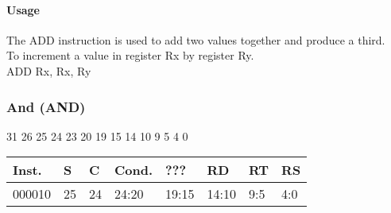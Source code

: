 \documentclass[12pt]{article}
\begin{document}
    \paragraph{Usage}
    \begin{flushleft}
    The ADD instruction is used to add two values together and produce a third.\\
    \vspace{1em}
    To increment a value in register Rx by register Ry.\\
    \vspace{1em}
    ADD Rx, Rx, Ry
    \end{flushleft}
    




    \newpage
    \subsubsection{And (AND)}
    
    \hspace{1.6cm}31 \hspace{1.2cm}26 \hspace{.075cm}25 \hspace{.15cm}24 \hspace{.075cm}23 \hspace{.875cm}20 \hspace{.04cm}19 \hspace{.8cm}15 \hspace{.04cm}14 \hspace{.8cm}10 \hspace{.04cm}9 \hspace{1.15cm}5 \hspace{.04cm}4 \hspace{1.25cm}0
    \vspace{-.25cm}
    \begin{center}
        \begin{tabular}{ |p{1.8cm}|p{.3cm}|p{.3cm}|p{1.5cm}|p{1.5cm}|p{1.5cm}|p{1.5cm}|p{1.5cm}| }
            \hline
            \textbf{Inst.} & \textbf{S}& \textbf{C} & \textbf{Cond.} & ??? & \textbf{RD} & \textbf{RT} & \textbf{RS}\\
            \hline
            000010& 25 & 24 & 24:20 & 19:15 & 14:10 & 9:5 & 4:0\\
            \hline
        \end{tabular}
    \end{center}
    
\end{document}
